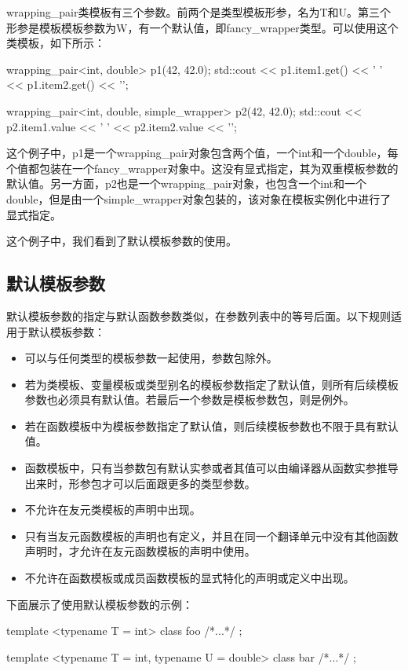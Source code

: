 wrapping_pair类模板有三个参数。前两个是类型模板形参，名为T和U。第三个形参是模板模板参数为W，有一个默认值，即fancy_wrapper类型。可以使用这个类模板，如下所示：

\begin{cppcode}
wrapping_pair<int, double> p1(42, 42.0);
std::cout << p1.item1.get() << ' '
		  << p1.item2.get() << '\n';

wrapping_pair<int, double, simple_wrapper> p2(42, 42.0);
std::cout << p2.item1.value << ' '
		  << p2.item2.value << '\n';
\end{cppcode}

这个例子中，p1是一个wrapping_pair对象包含两个值，一个int和一个double，每个值都包装在一个fancy_wrapper对象中。这没有显式指定，其为双重模板参数的默认值。另一方面，p2也是一个wrapping_pair对象，也包含一个int和一个double，但是由一个simple_wrapper对象包装的，该对象在模板实例化中进行了显式指定。

这个例子中，我们看到了默认模板参数的使用。

\subsection{默认模板参数}

默认模板参数的指定与默认函数参数类似，在参数列表中的等号后面。以下规则适用于默认模板参数：

\begin{itemize}
  \item 可以与任何类型的模板参数一起使用，参数包除外。
  \item 若为类模板、变量模板或类型别名的模板参数指定了默认值，则所有后续模板参数也必须具有默认值。若最后一个参数是模板参数包，则是例外。
  \item 若在函数模板中为模板参数指定了默认值，则后续模板参数也不限于具有默认值。
  \item 函数模板中，只有当参数包有默认实参或者其值可以由编译器从函数实参推导出来时，形参包才可以后面跟更多的类型参数。
  \item 不允许在友元类模板的声明中出现。
  \item 只有当友元函数模板的声明也有定义，并且在同一个翻译单元中没有其他函数声明时，才允许在友元函数模板的声明中使用。
  \item 不允许在函数模板或成员函数模板的显式特化的声明或定义中出现。
\end{itemize}

下面展示了使用默认模板参数的示例：

\begin{cppcode}
template <typename T = int>
class foo { /*...*/ };

template <typename T = int, typename U = double>
class bar { /*...*/ };
\end{cppcode}

